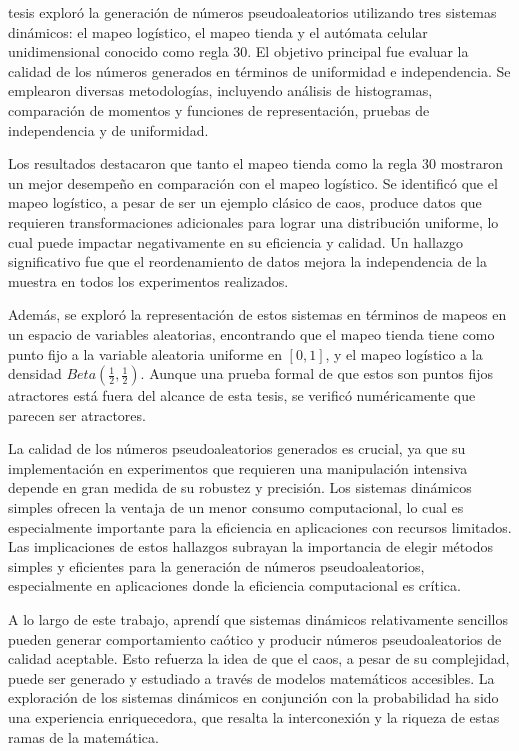 \documentclass[../Main.tex]{subfiles}
\begin{document}
 tesis exploró la generación de números pseudoaleatorios utilizando tres sistemas dinámicos: el mapeo logístico, el mapeo tienda y el autómata celular unidimensional conocido como regla 30. El objetivo principal fue evaluar la calidad de los números generados en términos de uniformidad e independencia. Se emplearon diversas metodologías, incluyendo análisis de histogramas, comparación de momentos y funciones de representación, pruebas de independencia y de uniformidad.

Los resultados destacaron que tanto el mapeo tienda como la regla 30 mostraron un mejor desempeño en comparación con el mapeo logístico. Se identificó que el mapeo logístico, a pesar de ser un ejemplo clásico de caos, produce datos que requieren transformaciones adicionales para lograr una distribución uniforme, lo cual puede impactar negativamente en su eficiencia y calidad. Un hallazgo significativo fue que el reordenamiento de datos mejora la independencia de la muestra en todos los experimentos realizados. 

Además, se exploró la representación de estos sistemas en términos de mapeos en un espacio de variables aleatorias, encontrando que el mapeo tienda tiene como punto fijo a la variable aleatoria uniforme en $[0,1]$, y el mapeo logístico a la densidad $Beta(\frac{1}{2},\frac{1}{2})$. Aunque una prueba formal de que estos son puntos fijos atractores está fuera del alcance de esta tesis, se verificó numéricamente que parecen ser atractores.

La calidad de los números pseudoaleatorios generados es crucial, ya que su implementación en experimentos que requieren una manipulación intensiva depende en gran medida de su robustez y precisión. Los sistemas dinámicos simples ofrecen la ventaja de un menor consumo computacional, lo cual es especialmente importante para la eficiencia en aplicaciones con recursos limitados. Las implicaciones de estos hallazgos subrayan la importancia de elegir métodos simples y eficientes para la generación de números pseudoaleatorios, especialmente en aplicaciones donde la eficiencia computacional es crítica. 

A lo largo de este trabajo, aprendí que sistemas dinámicos relativamente sencillos pueden generar comportamiento caótico y producir números pseudoaleatorios de calidad aceptable. Esto refuerza la idea de que el caos, a pesar de su complejidad, puede ser generado y estudiado a través de modelos matemáticos accesibles. La exploración de los sistemas dinámicos en conjunción con la probabilidad ha sido una experiencia enriquecedora, que resalta la interconexión y la riqueza de estas ramas de la matemática.
\end{document}
